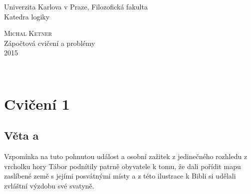 \documentclass[12pt,a4paper]{article}
\theoremstyle{definition}
\begin{document}
\begin{titlepage}
\Large
\begin{center}
Univerzita Karlova v Praze, Filozofická fakulta\\
Katedra logiky

\vspace{8.5em}
\textsc{Michal Ketner}\\[1.4em]
{%
Z\'{a}po\v{c}tov\'{a} cvi\v{c}en\'{i} a probl\'{e}my\\[6.8em]
2015}
\end{center}
\end{titlepage}\

\tableofcontents
\clearpage







\pagestyle{fancy} %
\renewcommand{\sectionmark}[1]{\markboth{\slshape\thesection.\ #1}{}}
\section{Cvi\v{c}en\'{i} 1 }
\subsection{V\v{e}ta a}
Vzpom\'{i}nka na tuto pohnutou ud\'{a}lost a osobn\'{i}  za\v{z}itek z jedine\v{c}n\'{e}ho rozhledu z vrcholku hory T\'{a}bor podn\'{i}tily patrn\v{e} obyvatele k tomu, \v{z}e dali po\v{r}\'{i}dit mapu zasl\'{i}ben\'{e}  zem\v{e} s jej\'{i}mi posv\'{a}tn\'{y}mi m\'{i}sty a z t\'{e}to ilustrace k Bibli si ud\v{e}lali zvl\'{a}\v{s}tn\'{i}  v\'{y}zdobu sv\'{e}  svatyn\v{e}.
\end{document}

